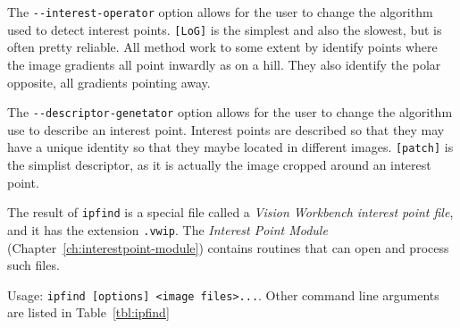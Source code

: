 The \verb#--interest-operator# option allows for the user to change the algorithm used to detect interest points. \verb#[LoG]# is the simplest and also the slowest, but is often pretty reliable. All method work to some extent by identify points where the image gradients all point inwardly as on a hill. They also identify the polar opposite, all gradients pointing away.

The \verb#--descriptor-genetator# option allows for the user to change the algorithm use to describe an interest point. Interest points are described so that they may have a unique identity so that they maybe located in different images. \verb#[patch]# is the simplist descriptor, as it is actually the image cropped around an interest point. 

The result of \verb#ipfind# is a special file called a \emph{Vision Workbench interest point file}, and it has the extension \verb#.vwip#. The \emph{Interest Point Module} (Chapter~\ref{ch:interestpoint-module}) contains routines that can open and process such files.

Usage: \verb#ipfind [options] <image files>...#. Other command line arguments are listed in Table~\ref{tbl:ipfind}

